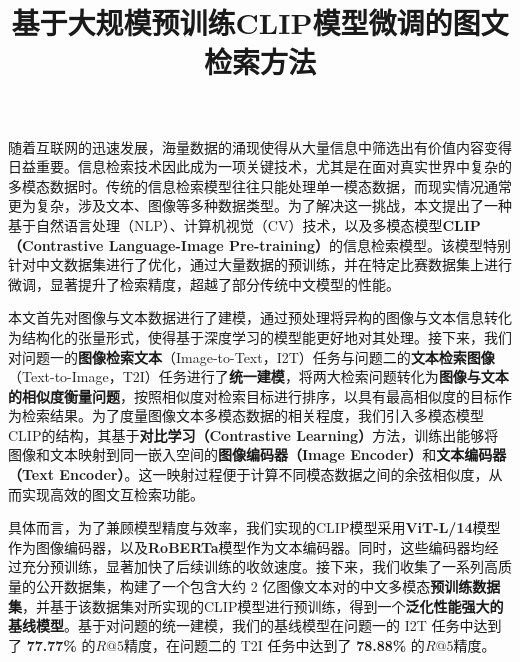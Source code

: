 \documentclass[a4paper]{zreport}
\title{基于大规模预训练CLIP模型微调的图文检索方法}
\begin{document}
\newpage

\vphantom{\Large hello}


\begingroup
{}

\vspace{3em}


\endgroup

\vspace{1em}

随着互联网的迅速发展，海量数据的涌现使得从大量信息中筛选出有价值内容变得日益重要。信息检索技术因此成为一项关键技术，尤其是在面对真实世界中复杂的多模态数据时。传统的信息检索模型往往只能处理单一模态数据，而现实情况通常更为复杂，涉及文本、图像等多种数据类型。为了解决这一挑战，本文提出了一种基于自然语言处理（NLP）、计算机视觉（CV）技术，以及多模态模型\textbf{CLIP（Contrastive Language-Image Pre-training）}的信息检索模型。该模型特别针对中文数据集进行了优化，通过大量数据的预训练，并在特定比赛数据集上进行微调，显著提升了检索精度，超越了部分传统中文模型的性能。

本文首先对图像与文本数据进行了建模，通过预处理将异构的图像与文本信息转化为结构化的张量形式，使得基于深度学习的模型能更好地对其处理。接下来，我们对问题一的\textbf{图像检索文本}（Image-to-Text，I2T）任务与问题二的\textbf{文本检索图像}（Text-to-Image，T2I）任务进行了\textbf{统一建模}，将两大检索问题转化为\textbf{图像与文本的相似度衡量问题}，按照相似度对检索目标进行排序，以具有最高相似度的目标作为检索结果。为了度量图像文本多模态数据的相关程度，我们引入多模态模型CLIP的结构，其基于\textbf{对比学习（Contrastive Learning）}方法，训练出能够将图像和文本映射到同一嵌入空间的\textbf{图像编码器（Image Encoder）}和\textbf{文本编码器（Text Encoder）}。这一映射过程便于计算不同模态数据之间的余弦相似度，从而实现高效的图文互检索功能。

具体而言，为了兼顾模型精度与效率，我们实现的CLIP模型采用\textbf{ViT-L/14}模型作为图像编码器，以及\textbf{RoBERTa}模型作为文本编码器。同时，这些编码器均经过充分预训练，显著加快了后续训练的收敛速度。接下来，我们收集了一系列高质量的公开数据集，构建了一个包含大约 2 亿图像文本对的中文多模态\textbf{预训练数据集}，并基于该数据集对所实现的CLIP模型进行预训练，得到一个\textbf{泛化性能强大的基线模型}。基于对问题的统一建模，我们的基线模型在问题一的 I2T 任务中达到了 \textbf{77.77\%} 的$R@5$精度，在问题二的 T2I 任务中达到了 \textbf{78.88\%} 的$R@5$精度。
\end{document}
